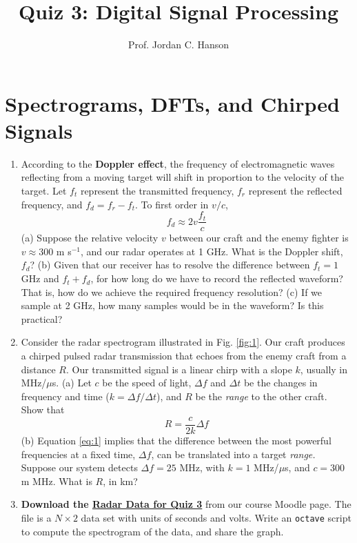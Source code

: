 \documentclass{article}
\begin{document}
\twocolumn

\title{Quiz 3: Digital Signal Processing}
\author{Prof. Jordan C. Hanson}

\maketitle
\small

\section{Spectrograms, DFTs, and Chirped Signals}

\begin{enumerate}
\item According to the \textbf{Doppler effect}, the frequency of electromagnetic waves reflecting from a moving target will shift in proportion to the velocity of the target.  Let $f_t$ represent the transmitted frequency, $f_r$ represent the reflected frequency, and $f_d = f_r - f_t$.  To first order in $v/c$, 
\begin{equation}
f_d \approx 2 v \frac{f_t}{c}
\end{equation}
(a) Suppose the relative velocity $v$ between our craft and the enemy fighter is $v \approx 300$ m s$^{-1}$, and our radar operates at 1 GHz.  What is the Doppler shift, $f_d$? (b) Given that our receiver has to resolve the difference between $f_t = 1$ GHz and $f_t+f_d$, for how long do we have to record the reflected waveform? That is, how do we achieve the required frequency resolution? (c) If we sample at 2 GHz, how many samples would be in the waveform?  Is this practical?
\item Consider the radar spectrogram illustrated in Fig. \ref{fig:1}.  Our craft produces a chirped pulsed radar transmission that echoes from the enemy craft from a distance $R$.  Our transmitted signal is a linear chirp with a slope $k$, usually in MHz/$\mu$s.  (a) Let $c$ be the speed of light, $\Delta f$ and $\Delta t$ be the changes in frequency and time ($k=\Delta f/\Delta t$), and $R$ be the \textit{range} to the other craft.  Show that
\begin{equation}
R = \frac{c}{2k}\Delta f \label{eq:1}
\end{equation}
(b) Equation \ref{eq:1} implies that the difference between the most powerful frequencies at a fixed time, $\Delta f$, can be translated into a target \textit{range.}  Suppose our system detects $\Delta f = 25$ MHz, with $k = 1$ MHz/$\mu$s, and $c = 300$ m MHz.  What is $R$, in km?
\item \textbf{Download the \textbf{\href{https://cms.whittier.edu/mod/resource/view.php?id=683184}{Radar Data for Quiz 3}}} from our course Moodle page.  The file is a $N \times 2$ data set with units of seconds and volts.  Write an \verb+octave+ script to compute the spectrogram of the data, and share the graph.

\end{enumerate}
\end{document}
